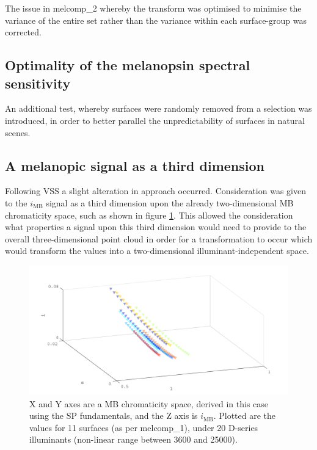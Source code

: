 The issue in melcomp\_2 whereby the transform was optimised to minimise the variance of the entire set rather than the variance within each surface-group was corrected.

\subsection{Optimality of the melanopsin spectral sensitivity}

An additional test, whereby surfaces were randomly removed from a selection was introduced, in order to better parallel the unpredictability of surfaces in natural scenes.


\subsection{A melanopic signal as a third dimension}

Following VSS a slight alteration in approach occurred. Consideration was given to the $i_{\text{MB}}$ signal as a third dimension upon the already two-dimensional \gls{MB} chromaticity space, such as shown in figure \ref{fig:ZL}. This allowed the consideration what properties a signal upon this third dimension would need to provide to the overall three-dimensional point cloud in order for a transformation to occur which would transform the values into a two-dimensional illuminant-independent space.

\begin{figure}[htbp]
 \includegraphics[max width=\textwidth]{figs/comp/melcomp_2/ZL.pdf}
 \caption{X and Y axes are a \gls{MB} chromaticity space, derived in this case using the \gls{SP} fundamentals, and the Z axis is $i_{\text{MB}}$. Plotted are the values for 11 surfaces (as per melcomp\_1), under 20 D-series illuminants (non-linear range between 3600 and 25000).}
 \label{fig:ZL}
\end{figure} %

